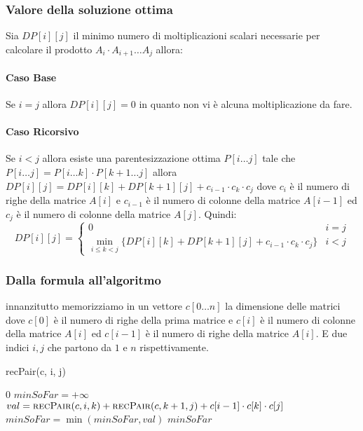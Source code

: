         \subsubsection{Valore della soluzione ottima}
            Sia $DP[i][j]$ il minimo numero di moltiplicazioni scalari necessarie per calcolare il prodotto $A_i\cdot A_{i+1}\dots A_j$ allora:
            \paragraph{Caso Base} Se $i=j$ allora $DP[i][j]=0$ in quanto non vi è alcuna moltiplicazione da fare.
            \paragraph{Caso Ricorsivo} Se $i<j$ allora esiste una parentesizzazione ottima $P[i\dots j]$ tale che $P[i\dots j]=P[i\dots k]\cdot P[k+1\dots j]$ allora $DP[i][j] = DP[i][k]+DP[k+1][j]+c_{i-1}\cdot c_k \cdot c_j$ dove $c_i$ è il numero di righe della matrice $A[i]$ e $c_{i-1}$ è il numero di colonne della matrice $A[i-1]$ ed $c_j$ è il numero di colonne della matrice $A[j]$.\newline
            Quindi: $$
                DP[i][j]=\begin{cases}
                    0 & i=j\\
                    \min_{i\leq k<j}\{DP[i][k]+DP[k+1][j]+c_{i-1}\cdot c_k \cdot c_j\} & i<j
                \end{cases}
            $$
        \subsubsection{Dalla formula all'algoritmo}
            innanzitutto memorizziamo in un vettore $c[0\dots n]$ la dimensione delle matrici dove $c[0]$ è il numero di righe della prima matrice e $c[i]$ è il numero di colonne della matrice $A[i]$ ed $c[i-1]$ è il numero di righe della matrice $A[i]$. E due indici $i,j$ che partono da $1$ e $n$ rispettivamente.
            \begin{algorithm}[H]
                \caption{\Int recPair(\Int c, \Int i, \Int j)}
                \begin{algorithmic}
                        \State \Return $0$
                    \Else
                        \State $minSoFar = +\infty$
                            \State $val = \Call{recPair}{c, i, k}+\Call{recPair}{c, k+1, j}+c[i-1]\cdot c[k]\cdot c[j]$
                            \State $minSoFar = \min(minSoFar, val)$
                        \EndFor
                        \State \Return $minSoFar$
                    \EndIf
                \end{algorithmic}
            \end{algorithm}
